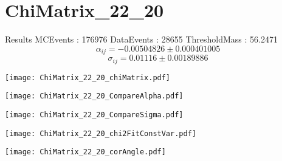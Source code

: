 \documentclass[a4paper,12pt]{article}
\begin{document}
\section{ChiMatrix\_22\_20}
\begin{minipage}{0.49\linewidth} Results \newline
MCEvents : 176976\newline
DataEvents : 28655 \newline
ThresholdMass : 56.2471\\
$$\alpha_{ij} = -0.00504826\pm 0.000401005$$
$$\sigma_{ij} = 0.01116\pm 0.00189886$$
\end{minipage}\hfill
\begin{minipage}{0.49\linewidth} 
\texttt{[image: ChiMatrix\_22\_20\_chiMatrix.pdf]}\\
\end{minipage}
\hfill
\begin{minipage}{0.49\linewidth} 
\texttt{[image: ChiMatrix\_22\_20\_CompareAlpha.pdf]}\\
\end{minipage}
\hfill
\begin{minipage}{0.49\linewidth} 
\texttt{[image: ChiMatrix\_22\_20\_CompareSigma.pdf]}\\
\end{minipage}
\begin{minipage}{0.49\linewidth} 
\texttt{[image: ChiMatrix\_22\_20\_chi2FitConstVar.pdf]}\\
\end{minipage}
\hfill
\begin{minipage}{0.49\linewidth} 
\texttt{[image: ChiMatrix\_22\_20\_corAngle.pdf]}\\
\end{minipage}
\end{document}
